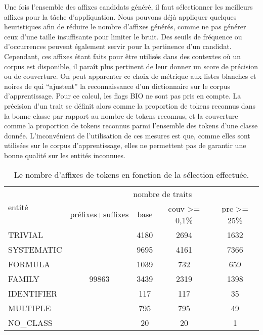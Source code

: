\documentclass[PhD-Yoann-Dupont.tex]{subfiles}
\begin{document}
    
Une fois l'ensemble des affixes candidats généré, il faut sélectionner les meilleurs affixes pour la tâche d'appliquation. Nous pouvons déjà appliquer quelques heuristiques afin de réduire le nombre d'affixes générés, comme ne pas générer ceux d'une taille insuffisante pour limiter le bruit. Des seuils de fréquence ou d'occurrences peuvent également servir pour la pertinence d'un candidat. Cependant, ces affixes étant faits pour être utilisés dans des contextes où un corpus est disponible, il paraît plus pertinent de leur donner un score de précision ou de couverture. On peut apparenter ce choix de métrique aux listes blanches et noires de \citet{lowe2014leadmine} qui ``ajustent'' la reconnaissance d'un dictionnaire sur le corpus d'apprentissage. Pour ce calcul, les flags BIO ne sont pas pris en compte. La précision d'un trait se définit alors comme la proportion de tokens reconnus dans la bonne classe par rapport au nombre de tokens reconnus, et la couverture comme la proportion de tokens reconnus parmi l'ensemble des tokens d'une classe donnée. L'inconvénient de l'utilisation de ces mesures est que, comme elles sont utilisées sur le corpus d'apprentissage, elles ne permettent pas de garantir une bonne qualité sur les entités inconnues.

\begin{table}[ht!]
\centering
\begin{tabular}{|l|c|c|c|c|}
\hline
\multirow{2}{*}{entité} & \multicolumn{4}{c|}{nombre de traits} \\
                        & préfixes+suffixes & base     & couv >= 0,1\% & prc >= 25\% \\
\hline
TRIVIAL                 & \multirow{7}{*}{99863} & 4180    & 2694           & 1632 \\
SYSTEMATIC              &                        & 9695    & 4161           & 7366 \\
FORMULA                 &                        & 1039    & 732            & 659  \\
FAMILY                  &                        & 3439    & 2319           & 1398 \\
IDENTIFIER              &                        & 117     & 117            & 35   \\
MULTIPLE                &                        & 795     & 795            & 49   \\
NO\_CLASS               &                        & 20      & 20             & 1    \\
\hline
\end{tabular}
\caption{Le nombre d'affixes de tokens en fonction de la sélection effectuée.}
\label{tab:affixe-selection}
\end{table}
\end{document}
